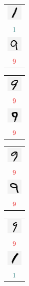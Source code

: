 \documentclass[11pt, justified]{tufte-book}
\theoremstyle{definition}
\begin{document}
\begin{figure}
          \begin{tabular}{c}\includegraphics[width=0.75cm]{example-mnist/mnist-trn-04}\\$\cya{1}$\\\includegraphics[width=0.75cm]{example-mnist/mnist-trn-14}\\$\red{9}$\end{tabular}%
          \begin{tabular}{c}\includegraphics[width=0.75cm]{example-mnist/mnist-trn-05}\\$\red{9}$\\\includegraphics[width=0.75cm]{example-mnist/mnist-trn-15}\\$\red{9}$\end{tabular}%
          \begin{tabular}{c}\includegraphics[width=0.75cm]{example-mnist/mnist-trn-06}\\$\red{9}$\\\includegraphics[width=0.75cm]{example-mnist/mnist-trn-16}\\$\red{9}$\end{tabular}%
          \begin{tabular}{c}\includegraphics[width=0.75cm]{example-mnist/mnist-trn-07}\\$\red{9}$\\\includegraphics[width=0.75cm]{example-mnist/mnist-trn-17}\\$\cya{1}$\end{tabular}%

\end{figure}
\end{document}
